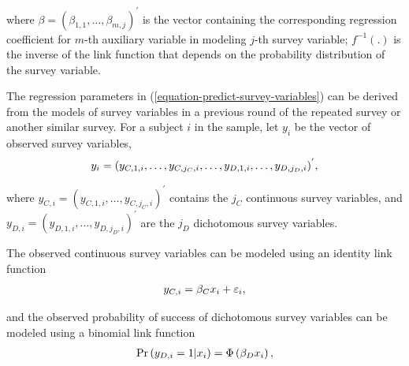 \documentclass[12pt]{article}
\begin{document}
where $\beta=(\beta_{1,1},\dots,\beta_{m,j})^{'}$ is the vector containing the corresponding regression coefficient for $m$-th auxiliary variable in modeling $j$-th survey variable; $f^{-1}(.)$ is the inverse of the link function that depends on the probability distribution of the survey variable.

The regression parameters in (\ref{equation-predict-survey-variables}) can be derived from the models of survey variables in a previous round of the repeated survey or another similar survey.
For a subject $i$ in the sample, let $y_i$ be the vector of observed survey variables,
\let\saveeqnno\theequation
\let\savefrac\frac
\def\dispfrac{\displaystyle\savefrac}
\begin{eqnarray*}
\let\frac\dispfrac
\let\theHequation\theequation
	y_i=(y_{C,1,i},\dots, y_{C,j_C,i},\dots, y_{D,1,i},\dots, y_{D,j_D,i})^{'},
\end{eqnarray*}
\global\let\theequation\saveeqnno
\addtocounter{equation}{-1}\ignorespaces

where $y_{C,i}=(y_{C,1,i},\dots,y_{C,j_C,i})^{'}$ contains the $j_C$ continuous survey variables, and $y_{D,i}=(y_{D,1,i},\dots,y_{D,j_D,i})^{'}$ are the $j_D$ dichotomous survey variables.

The observed continuous survey variables can be modeled using an identity link function
\let\saveeqnno\theequation
\let\savefrac\frac
\def\dispfrac{\displaystyle\savefrac}
\begin{eqnarray}
\let\frac\dispfrac
\gdef\theequation{2}
\let\theHequation\theequation
\label{equation-continuous-survey-variables}
	y_{C,i}=\beta_{C}x_{i}+\varepsilon_{i},
\end{eqnarray}
\global\let\theequation\saveeqnno
\addtocounter{equation}{-1}\ignorespaces

and the observed probability of success of dichotomous survey variables can be modeled using a binomial link function
\let\saveeqnno\theequation
\let\savefrac\frac
\def\dispfrac{\displaystyle\savefrac}
\begin{eqnarray}
\let\frac\dispfrac
\gdef\theequation{3}
\let\theHequation\theequation
\label{equation-dichotomous-survey-variables}
	\Pr\left(y_{D,i}=1|x_{i}\right)=\Phi\left(\beta_{D}x_{i}\right),
\end{eqnarray}
\global\let\theequation\saveeqnno
\addtocounter{equation}{-1}\ignorespaces
\end{document}
